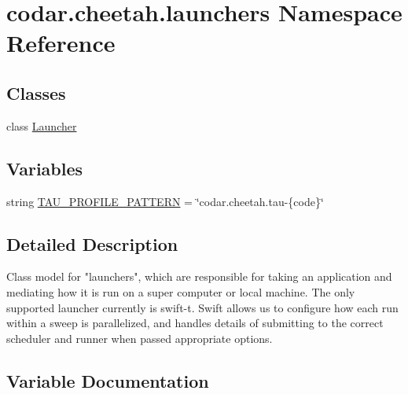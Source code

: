 \hypertarget{namespacecodar_1_1cheetah_1_1launchers}{}\section{codar.\+cheetah.\+launchers Namespace Reference}
\label{namespacecodar_1_1cheetah_1_1launchers}
\subsection*{Classes}
\begin{DoxyCompactItemize}
\item 
class \hyperlink{classcodar_1_1cheetah_1_1launchers_1_1_launcher}{Launcher}
\end{DoxyCompactItemize}
\subsection*{Variables}
\begin{DoxyCompactItemize}
\item 
string \hyperlink{namespacecodar_1_1cheetah_1_1launchers_a0e2d5331be8a9825f80a5e720b8fe93f}{T\+A\+U\+\_\+\+P\+R\+O\+F\+I\+L\+E\+\_\+\+P\+A\+T\+T\+E\+RN} = \char`\"{}codar.\+cheetah.\+tau-\/\{code\}\char`\"{}
\end{DoxyCompactItemize}


\subsection{Detailed Description}
\begin{DoxyVerb}Class model for "launchers", which are responsible for taking an application
and mediating how it is run on a super computer or local machine. The only
supported launcher currently is swift-t. Swift allows us to configure how
each run within a sweep is parallelized, and handles details of submitting to
the correct scheduler and runner when passed appropriate options.
\end{DoxyVerb}
 

\subsection{Variable Documentation}
\mbox{\label{namespacecodar_1_1cheetah_1_1launchers_a0e2d5331be8a9825f80a5e720b8fe93f}} 

